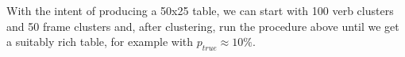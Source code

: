 \documentclass[a4paper]{article}
\begin{document}
With the intent of producing a 50x25 table, we can start with 100 verb clusters and 50 frame clusters and, after clustering, run the procedure above until we get a suitably rich table, for example with $p_{true} \approx 10\%$. 

\end{document}
